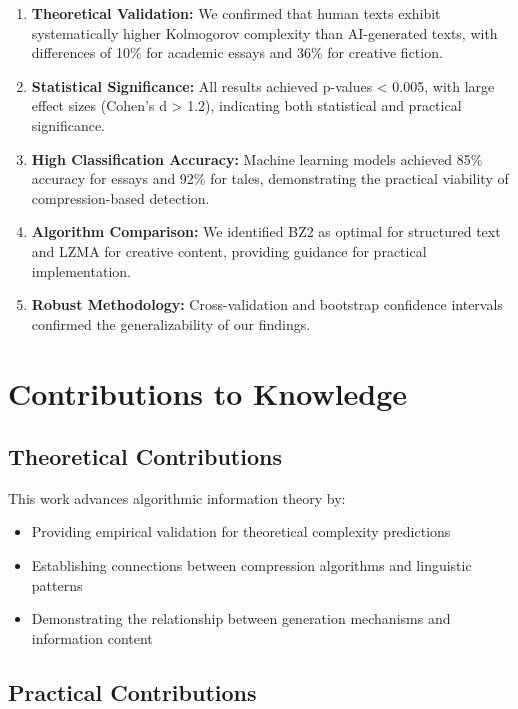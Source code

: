 \documentclass[12pt,a4paper]{report}
\begin{document}
\begin{enumerate}
    \item \textbf{Theoretical Validation:} We confirmed that human texts exhibit systematically higher Kolmogorov complexity than AI-generated texts, with differences of 10\% for academic essays and 36\% for creative fiction.

    \item \textbf{Statistical Significance:} All results achieved p-values < 0.005, with large effect sizes (Cohen's d > 1.2), indicating both statistical and practical significance.

    \item \textbf{High Classification Accuracy:} Machine learning models achieved 85\% accuracy for essays and 92\% for tales, demonstrating the practical viability of compression-based detection.

    \item \textbf{Algorithm Comparison:} We identified BZ2 as optimal for structured text and LZMA for creative content, providing guidance for practical implementation.

    \item \textbf{Robust Methodology:} Cross-validation and bootstrap confidence intervals confirmed the generalizability of our findings.
\end{enumerate}

\section{Contributions to Knowledge}

\subsection{Theoretical Contributions}

This work advances algorithmic information theory by:
\begin{itemize}
    \item Providing empirical validation for theoretical complexity predictions
    \item Establishing connections between compression algorithms and linguistic patterns
    \item Demonstrating the relationship between generation mechanisms and information content
\end{itemize}

\subsection{Practical Contributions}
\end{document}
